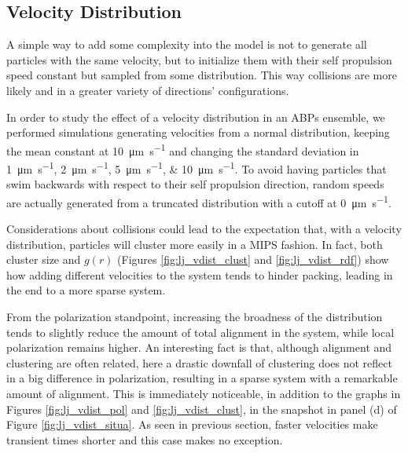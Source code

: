 \documentclass[../../master_thesis_np.tex]{subfiles}
\begin{document}
		\subsection{Velocity Distribution}
		A simple way to add some complexity into the model is not to generate all particles with the same velocity, but to initialize them with their self propulsion speed constant but sampled from some distribution. 
		This way collisions are more likely and in a greater variety of directions' configurations.
		
		In order to study the effect of a velocity distribution in an ABPs ensemble, we performed simulations generating velocities from a normal distribution, keeping the mean constant at \SI{10}{\um \per \second} and changing the standard deviation in \qtylist{1; 2; 5; 10}{\um \per \second}.
		To avoid having particles that swim backwards with respect to their self propulsion direction, random speeds are actually generated from a truncated distribution with a cutoff at \SI{0}{\um \per \second}.
		
		Considerations about collisions could lead to the expectation that, with a velocity distribution, particles will cluster more easily in a MIPS fashion.
		In fact, both cluster size and $g(r)$ (Figures \ref{fig:lj_vdist_clust} and \ref{fig:lj_vdist_rdf}) show how adding different velocities to the system tends to hinder packing, leading in the end to a more sparse system.
		
		From the polarization standpoint, increasing the broadness of the distribution tends to slightly reduce the amount of total alignment in the system, while local polarization remains higher. 
		An interesting fact is that, although alignment and clustering are often related, here a drastic downfall of clustering does not reflect in a big difference in polarization, resulting in a sparse system with a remarkable amount of alignment.
		This is immediately noticeable, in addition to the graphs in Figures \ref{fig:lj_vdist_pol} and \ref{fig:lj_vdist_clust}, in the snapshot in panel (d) of Figure \ref{fig:lj_vdist_situa}.
		As seen in previous section, faster velocities make transient times shorter and this case makes no exception.
		
\end{document}
